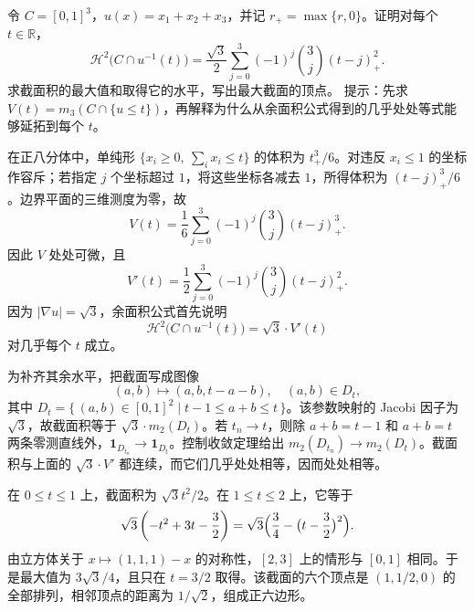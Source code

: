\begin{exercise}\label{b1:ex:18-cube-oblique-sections}
令 \(C=[0,1]^3\)，\(u(x)=x_1+x_2+x_3\)，并记 \(r_+=\max\{r,0\}\)。证明对每个 \(t\in\mathbb R\)，
\[
 \mathcal H^2\bigl(C\cap u^{-1}(t)\bigr)
 =\frac{\sqrt3}{2}\sum_{j=0}^3(-1)^j\binom3j(t-j)_+^2.
\]
求截面积的最大值和取得它的水平，写出最大截面的顶点。
提示：先求 \(V(t)=m_3(C\cap\{u\le t\})\)，再解释为什么从余面积公式得到的几乎处处等式能够延拓到每个 \(t\)。
\end{exercise}
\begin{solution}
在正八分体中，单纯形 \(\{x_i\ge0,\ \sum_i x_i\le t\}\) 的体积为 \(t_+^3/6\)。对违反 \(x_i\le1\) 的坐标作容斥；若指定 \(j\) 个坐标超过 \(1\)，将这些坐标各减去 \(1\)，所得体积为 \((t-j)_+^3/6\)。边界平面的三维测度为零，故
\[
 V(t)=\frac16\sum_{j=0}^3(-1)^j\binom3j(t-j)_+^3.
\]
因此 \(V\) 处处可微，且
\[
 V'(t)=\frac12\sum_{j=0}^3(-1)^j\binom3j(t-j)_+^2.
\]
因为 \(|\nabla u|=\sqrt3\)，余面积公式首先说明
\[
 \mathcal H^2\bigl(C\cap u^{-1}(t)\bigr)=\sqrt3\cdot V'(t)
\]
对几乎每个 \(t\) 成立。

为补齐其余水平，把截面写成图像
\[
 (a,b)\longmapsto(a,b,t-a-b),
 \quad (a,b)\in D_t,
\]
其中 \(D_t=\{\,(a,b)\in[0,1]^2\mid t-1\le a+b\le t\,\}\)。该参数映射的 Jacobi 因子为 \(\sqrt3\)，故截面积等于 \(\sqrt3\cdot m_2(D_t)\)。若 \(t_n\to t\)，则除 \(a+b=t-1\) 和 \(a+b=t\) 两条零测直线外，\(\mathbf1_{D_{t_n}}\to\mathbf1_{D_t}\)。控制收敛定理给出 \(m_2(D_{t_n})\to m_2(D_t)\)。截面积与上面的 \(\sqrt3\cdot V'\) 都连续，而它们几乎处处相等，因而处处相等。

在 \(0\le t\le1\) 上，截面积为 \(\sqrt3t^2/2\)。在 \(1\le t\le2\) 上，它等于
\[
 \sqrt3\left(-t^2+3t-\frac32\right)
 =\sqrt3\Bigl(\frac34-\bigl(t-\frac32\bigr)^2\Bigr).
\]
由立方体关于 \(x\mapsto(1,1,1)-x\) 的对称性，\([2,3]\) 上的情形与 \([0,1]\) 相同。于是最大值为 \(3\sqrt3/4\)，且只在 \(t=3/2\) 取得。该截面的六个顶点是 \((1,1/2,0)\) 的全部排列，相邻顶点的距离为 \(1/\sqrt2\)，组成正六边形。
\end{solution}

